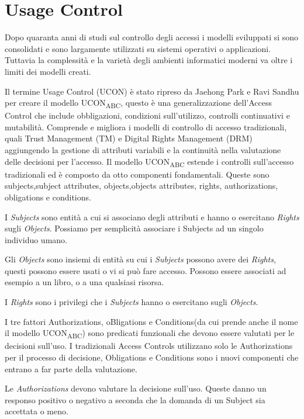 \section{Usage Control}
\label{sec:Usage_Control}
Dopo quaranta anni di studi sul controllo degli accessi i modelli sviluppati si sono consolidati e sono largamente utilizzati
su sistemi operativi o applicazioni. Tuttavia la complessità e la varietà degli ambienti informatici moderni va oltre i limiti
dei modelli creati.\par
Il termine Usage Control (UCON) è stato ripreso da Jaehong Park e Ravi Sandhu per creare il modello UCON\textsubscript{ABC}\cite{ucon},
questo è una generalizzazione dell'Access Control che include obbligazioni, condizioni sull'utilizzo,
controlli continuativi e mutabilità. Comprende e migliora i modelli di controllo di accesso tradizionali, quali Trust
Management (TM) e Digital Rights Management (DRM) aggiungendo la gestione di attributi variabili e la continuità nella valutazione
delle decisioni per l'accesso. Il modello UCON\textsubscript{ABC} estende i controlli sull'accesso tradizionali ed è composto da otto componenti fondamentali.
Queste sono subjects,subject attributes, objects,objects attributes, rights, authorizations, obligations e conditions.\par
{}
I \emph{Subjects} sono entità a cui si associano degli attributi e hanno o esercitano \emph{Rights} sugli \emph{Objects}. Possiamo per semplicità
associare i Subjects ad un singolo individuo umano.\par
Gli \emph{Objects} sono insiemi di entità su cui i \emph{Subjects} possono avere dei \emph{Rights}, questi possono essere usati o vi si può
fare accesso. Possono essere associati ad esempio a un libro, o a una qualsiasi risorsa.\par
I \emph{Rights} sono i privilegi che i \emph{Subjects} hanno o esercitano sugli \emph{Objects}.\par
I tre fattori Authorizations, oBligations e Conditions(da cui prende anche il
nome il modello UCON\textsubscript{ABC}) sono predicati funzionali che devono essere valutati per le decisioni sull'uso.
I tradizionali Access Controls utilizzano solo le Authorizations per il processo di decisione, Obligations e Conditions
sono i nuovi componenti che entrano a far parte della valutazione.\par
Le \emph{Authorizations} devono valutare la decisione sull'uso. Queste danno un responso positivo
o negativo a seconda che la domanda di un Subject sia accettata o meno.\par
